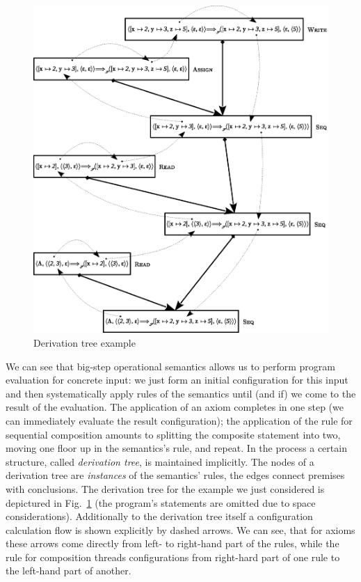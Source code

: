 \begin{figure}[t]
  \centering
  \includegraphics[scale=0.8]{images/03-01.eps}
  \caption{Derivation tree example}
  \label{derivation-tree}
\end{figure}

We can see that big-step operational semantics allows us to perform program evaluation for concrete input: we just form an initial configuration for this input and then
systematically apply rules of the semantics until (and if) we come to the result of the evaluation. The application of an axiom completes in one
step (we can immediately evaluate the result configuration); the application of the rule for sequential composition amounts to splitting the composite
statement into two, moving one floor up in the semantics's rule, and repeat. In the process a certain structure, called \emph{derivation tree}, is
maintained implicitly. The nodes of a derivation tree are \emph{instances} of the semantics' rules, the edges connect premises with conclusions. The derivation
tree for the example we just considered is depictured in Fig.~\ref{derivation-tree} (the program's statements are omitted due to space considerations). Additionally
to the derivation tree itself a configuration calculation flow is shown explicitly by dashed arrows. We can see, that for axioms these arrows come directly from
left- to right-hand part of the rules, while the rule for composition threads configurations from right-hard part of one rule to the left-hand part of another.

